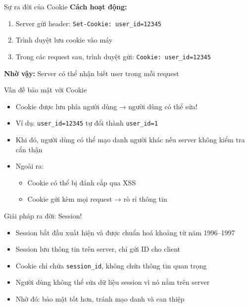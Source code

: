 \documentclass[aspectratio=169]{beamer}
\begin{document}
\begin{frame}{Sự ra đời của Cookie}
  \textbf{Cách hoạt động:}
  \begin{enumerate}
    \item Server gửi header: \texttt{Set-Cookie: user\_id=12345}
    \item Trình duyệt lưu cookie vào máy
    \item Trong các request sau, trình duyệt gửi: \texttt{Cookie: user\_id=12345}
  \end{enumerate}

  \vspace{0.5em}
  \textbf{Nhờ vậy:} Server có thể nhận biết user trong mỗi request
\end{frame}

\begin{frame}{Vấn đề bảo mật với Cookie}
  \begin{itemize}
    \item Cookie được lưu phía người dùng → người dùng có thể sửa!
    \item Ví dụ: \texttt{user\_id=12345} tự đổi thành \texttt{user\_id=1}
    \item Khi đó, người dùng có thể mạo danh người khác nếu server không kiểm tra cẩn thận
    \item Ngoài ra:
    \begin{itemize}
      \item Cookie có thể bị đánh cắp qua XSS
      \item Cookie gửi kèm mọi request → rò rỉ thông tin
    \end{itemize}
  \end{itemize}
\end{frame}

\begin{frame}{Giải pháp ra đời: Session!}
  \begin{itemize}
    \item Session bắt đầu xuất hiện và được chuẩn hoá khoảng từ năm 1996–1997
    \item Session lưu thông tin trên server, chỉ gửi ID cho client
    \item Cookie chỉ chứa \texttt{session\_id}, không chứa thông tin quan trọng
    \item Người dùng không thể sửa dữ liệu session vì nó nằm trên server
    \item Nhờ đó: bảo mật tốt hơn, tránh mạo danh và can thiệp
  \end{itemize}
\end{frame}
\end{document}
